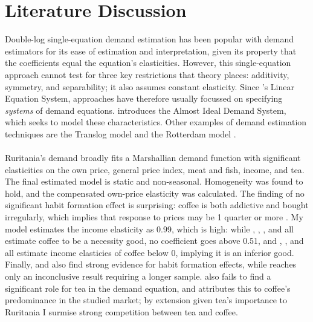 \documentclass[12pt]{article}
\begin{document}
\section{Literature Discussion} %
\label{sec:literature_review}
Double-log single-equation demand estimation has been popular with demand estimators for its ease of estimation and interpretation, given its property that the coefficients equal the equation's elasticities. However, this single-equation approach cannot test for three key restrictions that theory places: additivity, symmetry, and separability; it also assumes constant elasticity. Since \textcite{stoneLinearExpenditureSystems1954}'s Linear Equation System, approaches have therefore usually focussed on specifying \emph{systems} of demand equations. \textcite{deatonAlmostIdealDemand1980} introduces the Almost Ideal Demand System, which seeks to model these characteristics. Other examples of demand estimation techniques are the Translog model \parencite{pollakEstimationCompleteDemand1978} and the Rotterdam model \parencite{leeModelChoiceConsumer1994}. 
\\\\
Ruritania's demand broadly fits a Marshallian demand function with significant elasticities on the own price, general price index, meat and fish, income, and tea. The final estimated model is static and non-seasonal. Homogeneity was found to hold, and the compensated own-price elasticity was calculated. The finding of no significant habit formation effect is surprising: coffee is both addictive and bought irregularly, which implies that response to prices may be 1 quarter or more \parencite{durevallCompetitionSwedishCoffee2007}. My model estimates the income elasticity as 0.99, which is high: while \textcite{huangDemandCoffeeUnited1980}, \textcite{hughesNoteDemandCoffee1969}, \textcite{dalyCoffeeConsumptionPrices1958}, and \textcite{abaeluUSImportDemand1968} all estimate coffee to be a necessity good, no coefficient goes above 0.51, and \textcite{timmsWorldDemandProspects1973}, \textcite{lawranceUSCoffeeConsumption1977}, and \textcite{heienDemandAlcoholicBeverages1989} all estimate income elasticies of coffee below 0, implying it is an inferior good. Finally, \textcite{okunadeFunctionalFormsHabit1992} and \textcite{parikhUnitedStatesEuropean1973} also find strong evidence for habit formation effects, while \textcite{bettendorfCompetitionDutchCoffee1998} reaches only an inconclusive result requiring a longer sample. \textcite{durevallDemandCoffeeSweden2007} also fails to find a significant role for tea in the demand equation, and attributes this to coffee's predominance in the studied market; by extension given tea's importance to Ruritania I surmise strong competition between tea and coffee. 
\end{document}
